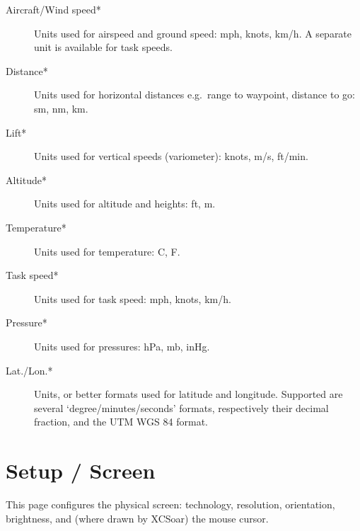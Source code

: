 \begin{description}
\item[Aircraft/Wind speed*]  Units used for airspeed and ground speed: mph, 
  knots, km/h. A separate unit is available for task speeds.
\item[Distance*]  Units used for horizontal distances e.g.\ range to waypoint,
  distance to go: sm, nm, km.
\item[Lift*]  Units used for vertical speeds (variometer): knots, m/s, ft/min.
\item[Altitude*] Units used for altitude and heights: ft, m.
\item[Temperature*]  Units used for temperature: \degree C, \degree F.
\item[Task speed*] Units used for task speed: mph, knots, km/h.
\item[Pressure*]  Units used for pressures: hPa, mb, inHg.
\item[Lat./Lon.*]  Units, or better formats used for latitude and longitude. 
  Supported are several `degree/minutes/seconds' formats, respectively 
  their decimal fraction, and the  UTM WGS 84 format.
\end{description}


\section{Setup / Screen}\label{sec:look-screen}
\label{sec:interface-display}

This page configures the physical screen: technology, resolution,
orientation, brightness, and (where drawn by XCSoar) the mouse cursor.

